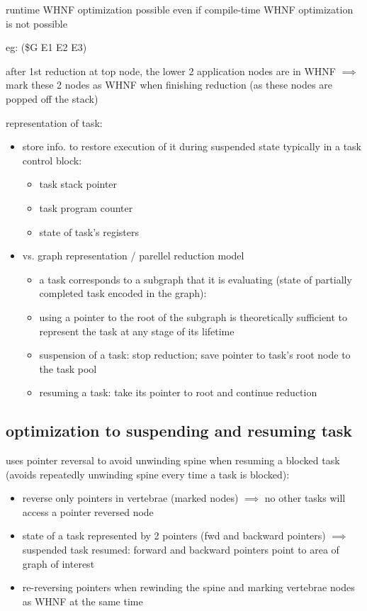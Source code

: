 \documentclass[8pt]{extarticle}
\begin{document}
\begin{multicols*}{2}
runtime WHNF optimization possible even if compile-time WHNF optimization is not possible

eg: (\$G E1 E2 E3)

after 1st reduction at top node, the lower 2 application nodes are in WHNF $\implies$ mark these 2 nodes as WHNF when finishing reduction (as these nodes are popped off the stack)

representation of task:
\begin{itemize}
\item store info. to restore execution of it during suspended state
  typically in a task control block:
  \begin{itemize}
  \item task stack pointer
  \item task program counter
  \item state of task's registers
  \end{itemize}
\item vs. graph representation / parellel reduction model
  \begin{itemize}
  \item a task corresponds to a subgraph that it is evaluating (state of partially completed task encoded in the graph):
  \item using a pointer to the root of the subgraph is theoretically sufficient to represent the task at any stage of its lifetime
  \item suspension of a task: stop reduction; save pointer to task's root node to the task pool
  \item resuming a task: take its pointer to root and continue reduction
  \end{itemize}
\end{itemize}

\subsection{optimization to suspending and resuming task}

uses pointer reversal to avoid unwinding spine when resuming a blocked task (avoids repeatedly unwinding spine every time a task is blocked):
\begin{itemize}
\item reverse only pointers in vertebrae (marked nodes) $\implies$ no other tasks will access a pointer reversed node
\item state of a task represented by 2 pointers (fwd and backward pointers) $\implies$ suspended task resumed: forward and backward pointers point to area of graph of interest
\item re-reversing pointers when rewinding the spine and marking vertebrae nodes as WHNF at the same time
\end{itemize}


\end{multicols*}
\end{document}
